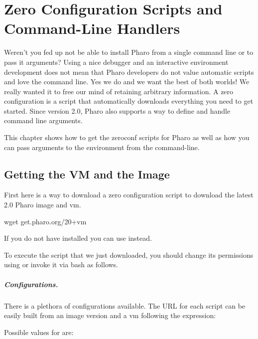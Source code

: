 \documentclass[a4paper,10pt,twoside]{book}
\begin{document}
\fi
\sloppy

\chapter{Zero Configuration Scripts and Command-Line Handlers}
\chapterauthor{\authorcamillo}

Weren't you fed up not be able to install Pharo from a single command line or to pass it arguments? 
Using a nice debugger and an interactive environment development does not 
mean that Pharo developers do not value automatic scripts and love the command line.
Yes we do and we want the best of both worlds! We really wanted it to free our mind of retaining arbitrary information. A zero configuration is a script that automatically downloads everything you need to get started. Since version 2.0, Pharo also supports a way to define and handle command line arguments. 

This chapter shows how to get the zeroconf scripts for Pharo as well as how you can pass arguments to the environment from the command-line.


\section{Getting the VM and the Image}
First here is a way to download a zero configuration script to download the latest 2.0 Pharo image and vm. 

\begin{code}{}
wget get.pharo.org/20+vm
\end{code}

If you do not have  installed you can use  instead.

To execute the script that we just downloaded, you should change its permissions using   or invoke it via bash as follows. 

\paragraph{Configurations.}
There is a plethora of configurations available. The URL for each script can
be easily built from an image version and a vm following the expression: 
	
Possible values for  are: 
\end{document}
